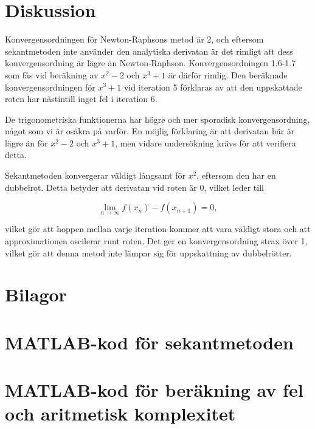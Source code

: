 \documentclass[a4paper,titlepage]{article}
\begin{document}
\section{Diskussion}

Konvergensordningen för Newton-Raphsons metod är 2, och eftersom sekantmetoden
inte använder den analytiska derivatan är det rimligt att dess konvergensordning är lägre
än Newton-Raphson. Konvergensordningen 1.6-1.7 som fås vid beräkning av $x^2-2$ och
$x^3 + 1$ är därför rimlig. Den beräknade konvergensordningen för $x^3 + 1$ vid
iteration 5 förklaras av att den uppskattade roten har nästintill inget fel i
iteration 6.

De trigonometriska funktionerna har högre och mer sporadisk konvergensordning,
något som vi är osäkra på varför. En möjlig förklaring är att derivatan här är
lägre än för $x^2-2$ och $x^3 + 1$, men vidare undersökning krävs för att
verifiera detta.

Sekantmetoden konvergerar väldigt långsamt för $x^2$, eftersom den har en
dubbelrot. Detta betyder att derivatan vid roten är 0, vilket leder till

\[
    \lim_{n \to \infty} f(x_n) - f(x_{n+1}) = 0,
\]

vilket gör att hoppen mellan varje iteration kommer att vara väldigt stora och att
approximationen oscilerar runt roten. Det ger en konvergensordning strax över
1, vilket gör att denna metod inte lämpar sig för uppskattning av dubbelrötter.

\section*{Bilagor}
\appendix

\section{MATLAB-kod för sekantmetoden}


\section{MATLAB-kod för beräkning av fel och aritmetisk komplexitet}
\label{sec:testcode}


\end{document}
